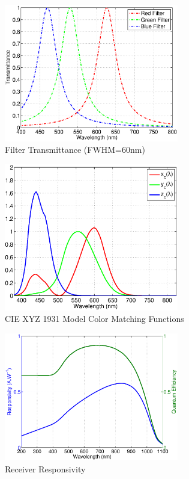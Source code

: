 \begin{figure}
	\centering
		\includegraphics[width=3in]{img/FiltTr.eps}
	\caption{Filter Transmittance (FWHM=60nm)}
	\label{fig:FiltTr}
\end{figure}

\begin{figure}
	\centering
		\includegraphics[width=3in]{img/CIE1931CMF.eps}
	\caption{CIE XYZ 1931 Model Color Matching Functions}
	\label{fig:CIE1931CMF}
\end{figure}

\begin{figure}
	\centering
		\includegraphics[width=3in]{img/RecvResp.eps}
	\caption{Receiver Responsivity}
	\label{fig:RecvResp}
\end{figure}

